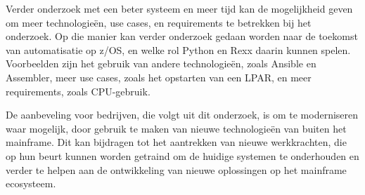 Verder onderzoek met een beter systeem en meer tijd kan de mogelijkheid geven om meer technologieën, use cases, en requirements te betrekken bij het onderzoek. Op die manier kan verder onderzoek gedaan worden naar de toekomst van automatisatie op z/OS, en welke rol Python en Rexx daarin kunnen spelen. Voorbeelden zijn het gebruik van andere technologieën, zoals Ansible en Assembler, meer use cases, zoals het opstarten van een LPAR, en meer requirements, zoals CPU-gebruik.

De aanbeveling voor bedrijven, die volgt uit dit onderzoek, is om te moderniseren waar mogelijk, door gebruik te maken van nieuwe technologieën van buiten het mainframe. Dit kan bijdragen tot het aantrekken van nieuwe werkkrachten, die op hun beurt kunnen worden getraind om de huidige systemen te onderhouden en verder te helpen aan de ontwikkeling van nieuwe oplossingen op het mainframe ecosysteem.